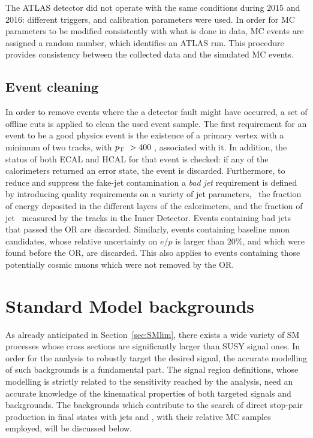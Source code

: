 		The \ac{ATLAS} detector did not operate with the same conditions during $2015$ and $2016$: different triggers, and calibration parameters were used. In order for \ac{MC} parameters to be modified consistently with what is done in data, \ac{MC} events are assigned a random number, which identifies an ATLAS run. This procedure provides consistency between the collected data and the simulated \ac{MC} events. %

		\subsection{Event cleaning}

			In order to remove events where the a detector fault might have occurred, a set of offline cuts is applied to clean the used event sample. The first requirement for an event to be a good physics event is the existence of a primary vertex with a minimum of two tracks, with $p_{\mathrm{T}}\ > 400$ \MeV, associated with it. In addition, the status of both \ac{ECAL} and \ac{HCAL} for that event is checked: if any of the calorimeters returned an error state, the event is discarded. Furthermore, to reduce and suppress the fake-jet contamination a \emph{bad jet} requirement is defined by introducing quality requirements on a variety of jet parameters, \eg\ the fraction of energy deposited in the different layers of the calorimeters, and the fraction of jet \pt\ measured by the tracks in the Inner Detector. Events containing bad jets that passed the \ac{OR} are discarded. Similarly, events containing baseline muon candidates, whose relative uncertainty on $e/p$ is larger than $20\%$, and which were found before the \ac{OR}, are discarded. This also applies to events containing those potentially cosmic muons which were not removed by the \ac{OR}.				


	\section{Standard Model backgrounds}
	\label{sec:SMbkg}

		As already anticipated in Section~\ref{sec:SMlim}, there exists a wide variety of \ac{SM} processes whose cross sections are significantly larger than \ac{SUSY} signal ones. In order for the analysis to robustly target the desired signal, the accurate modelling of such backgrounds is a fundamental part. The signal region definitions, whose modelling is strictly related to the sensitivity reached by the analysis, need an accurate knowledge of the kinematical properties of both targeted signals and backgrounds. The backgrounds which contribute to the search of direct stop-pair production in final states with jets and \met, with their relative \ac{MC} samples employed, will be discussed below.

